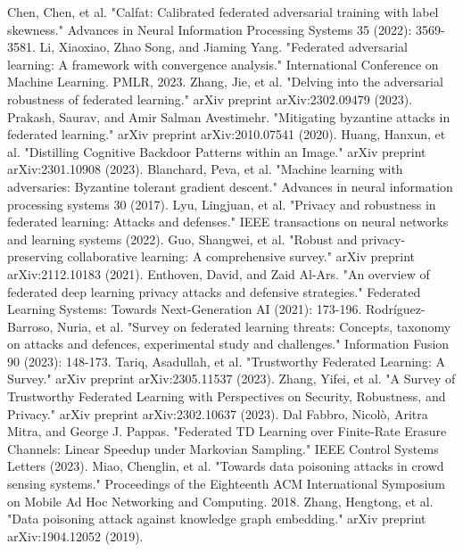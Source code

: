 \documentclass[conference]{IEEEtran}
\begin{document}
\begin{thebibliography}{00}
     Chen, Chen, et al. "Calfat: Calibrated federated adversarial training with label skewness." Advances in Neural Information Processing Systems 35 (2022): 3569-3581.
     Li, Xiaoxiao, Zhao Song, and Jiaming Yang. "Federated adversarial learning: A framework with convergence analysis." International Conference on Machine Learning. PMLR, 2023.
     Zhang, Jie, et al. "Delving into the adversarial robustness of federated learning." arXiv preprint arXiv:2302.09479 (2023).
     Prakash, Saurav, and Amir Salman Avestimehr. "Mitigating byzantine attacks in federated learning." arXiv preprint arXiv:2010.07541 (2020).
     Huang, Hanxun, et al. "Distilling Cognitive Backdoor Patterns within an Image." arXiv preprint arXiv:2301.10908 (2023).
     Blanchard, Peva, et al. "Machine learning with adversaries: Byzantine tolerant gradient descent." Advances in neural information processing systems 30 (2017).
     Lyu, Lingjuan, et al. "Privacy and robustness in federated learning: Attacks and defenses." IEEE transactions on neural networks and learning systems (2022).
     Guo, Shangwei, et al. "Robust and privacy-preserving collaborative learning: A comprehensive survey." arXiv preprint arXiv:2112.10183 (2021).
     Enthoven, David, and Zaid Al-Ars. "An overview of federated deep learning privacy attacks and defensive strategies." Federated Learning Systems: Towards Next-Generation AI (2021): 173-196.
     Rodríguez-Barroso, Nuria, et al. "Survey on federated learning threats: Concepts, taxonomy on attacks and defences, experimental study and challenges." Information Fusion 90 (2023): 148-173.
     Tariq, Asadullah, et al. "Trustworthy Federated Learning: A Survey." arXiv preprint arXiv:2305.11537 (2023).
     Zhang, Yifei, et al. "A Survey of Trustworthy Federated Learning with Perspectives on Security, Robustness, and Privacy." arXiv preprint arXiv:2302.10637 (2023).
     Dal Fabbro, Nicolò, Aritra Mitra, and George J. Pappas. "Federated TD Learning over Finite-Rate Erasure Channels: Linear Speedup under Markovian Sampling." IEEE Control Systems Letters (2023).
     Miao, Chenglin, et al. "Towards data poisoning attacks in crowd sensing systems." Proceedings of the Eighteenth ACM International Symposium on Mobile Ad Hoc Networking and Computing. 2018.
     Zhang, Hengtong, et al. "Data poisoning attack against knowledge graph embedding." arXiv preprint arXiv:1904.12052 (2019).

\end{thebibliography}
\end{document}
